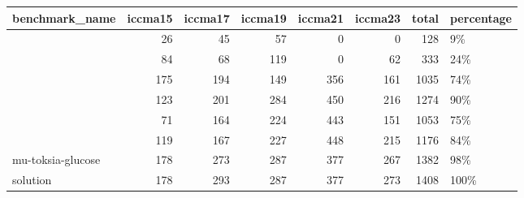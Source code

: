 \begin{tabular}{lrrrrrr}
\toprule
benchmark\_name &  iccma15 &  iccma17 &  iccma19 &  iccma21 &  iccma23 &  total & percentage \\
\midrule
{}            &       26 &       45 &       57 &        0 &        0 &    128 &         9\% \\
            &       84 &       68 &      119 &        0 &       62 &    333 &        24\% \\
            &      175 &      194 &      149 &      356 &      161 &   1035 &        74\% \\
            &      123 &      201 &      284 &      450 &      216 &   1274 &        90\% \\
            &       71 &      164 &      224 &      443 &      151 &   1053 &        75\% \\
            &      119 &      167 &      227 &      448 &      215 &   1176 &        84\% \\
mu-toksia-glucose &      178 &      273 &      287 &      377 &      267 &   1382 &        98\% \\
\midrule
solution          &      178 &      293 &      287 &      377 &      273 &   1408 &       100\% \\
\bottomrule
\end{tabular}
